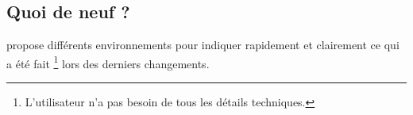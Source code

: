 \documentclass[12pt, a4paper]{article}
\begin{document}
\subsection{Quoi de neuf ?}

 propose différents environnements pour indiquer rapidement et clairement ce qui a été fait
\footnote{
    L'utilisateur n'a pas besoin de tous les détails techniques.
}
lors des derniers changements.


\begin{tdocexa}
    \leavevmode

\end{tdocexa}




\begin{tdocexa}
    \leavevmode

\end{tdocexa}




\begin{tdocexa}
    \leavevmode

\end{tdocexa}




\begin{tdocexa}
    \leavevmode

\end{tdocexa}
\end{document}
